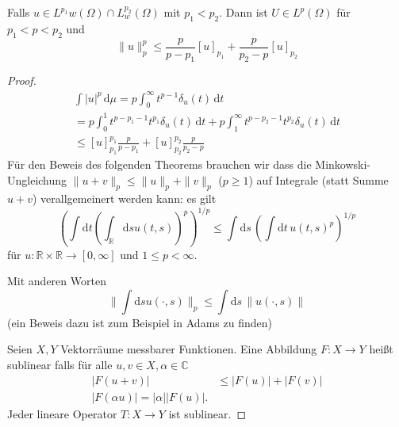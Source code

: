 \documentclass[
paper=a4,
bibtotocnumbered,
liststotocnumbered,
tablecaptionabove,
pointlessnumbers,
twoside,
openright,
10pt
]
{report}
\theoremstyle{definition}
\numberwithin{equation}{chapter}
\begin{document}
Falls $u\in L^{p_1}{w}(\Omega) \cap L^{p_2}_w (\Omega)$ mit $p_1 <p_2$. Dann ist $U\in L^p(\Omega)$ für $p_1 <p <p_2$ und 
\begin{equation}
\|u\|^p_p \le \frac{p}{p-p_1} [u]_{p_1} + \frac{p}{p_2-p} [u]_{p_2}
\end{equation}
\begin{proof}
\begin{gather}
\int |u|^p \, \mathrm d\mu = p \int_0^\infty t^{p-1} \delta_u(t) \, \mathrm dt\\
= p \int_0^1 t^{p-p_1 -1} t^{p_1} \delta_u (t) \, \mathrm dt + p \int_1^\infty t^{p-p_2-1} t^{p_2} \delta_u(t) \, \mathrm dt\\
\le [u]_{p_1}^{p_1} \frac{p}{p-p_1} + [u]^{p_2}_{p_2} \frac{p}{p_2-p}
\end{gather}
Für den Beweis des folgenden Theorems brauchen wir dass die Minkowski-Ungleichung $\| u+v\|_{p} \le \|u\|_p + \| v\|_p$ ($p\ge 1$) auf Integrale (statt Summe $u+v$) verallgemeinert werden kann: es gilt
\begin{equation}
\left (\int \mathrm dt \left ( \int_{\mathbb R} \mathrm ds u(t,s) \right )^p \right )^{1/p} \le \int \mathrm ds \, \left ( \int \mathrm dt\, u(t,s)^p \right )^{1/p} 
\end{equation}
für $u: \mathbb R \times \mathbb R \to [0,\infty]$ und $1\le p <\infty$.

Mit anderen Worten
\begin{equation}
\| \int \mathrm ds u(\cdot, s) \|_p \le \int \mathrm ds \, \| u(\cdot,s)\|
\end{equation}
(ein Beweis dazu ist zum Beispiel in Adams zu finden)

Seien $X,Y$ Vektorräume messbarer Funktionen. Eine Abbildung $F: X \to Y$ heißt sublinear falls für alle $u,v\in X, \alpha \in \mathbb C$
\begin{align}
|F(u+v)|&\le |F(u)|+|F(v)|\\
|F(\alpha u)| = |\alpha| | F(u)|.
\end{align}
Jeder lineare Operator $T: X\to Y$ ist sublinear.


\end{proof}
\end{document}
